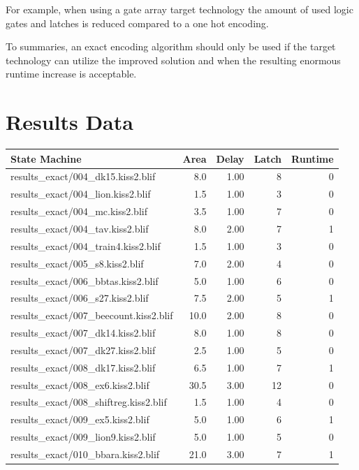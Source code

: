 For example, when using a gate array target technology the amount of used logic gates and latches is reduced compared to a one hot encoding.

To summaries, an exact encoding algorithm should only be used if the target technology can utilize the improved solution and when the resulting enormous runtime increase is acceptable. 

\chapter*{Results Data}

\begin{table}[h]
\centering
	\begin{tabular}{|l|r|r|r|r|}
	\hline
		\textbf{State Machine} & \textbf{Area} & \textbf{Delay} & \textbf{Latch} & \textbf{Runtime}\\
		\hline
		results\_exact/004\_dk15.kiss2.blif & 8.0 & 1.00 & 8 & 0\\
		results\_exact/004\_lion.kiss2.blif & 1.5 & 1.00 & 3 & 0\\
		results\_exact/004\_mc.kiss2.blif & 3.5 & 1.00 & 7 & 0\\
		results\_exact/004\_tav.kiss2.blif & 8.0 & 2.00 & 7 & 1\\
		results\_exact/004\_train4.kiss2.blif & 1.5 & 1.00 & 3 & 0\\
		results\_exact/005\_s8.kiss2.blif & 7.0 & 2.00 & 4 & 0\\
		results\_exact/006\_bbtas.kiss2.blif & 5.0 & 1.00 & 6 & 0\\
		results\_exact/006\_s27.kiss2.blif & 7.5 & 2.00 & 5 & 1\\
		results\_exact/007\_beecount.kiss2.blif & 10.0 & 2.00 & 8 & 0\\
		results\_exact/007\_dk14.kiss2.blif & 8.0 & 1.00 & 8 & 0\\
		results\_exact/007\_dk27.kiss2.blif & 2.5 & 1.00 & 5 & 0\\
		results\_exact/008\_dk17.kiss2.blif & 6.5 & 1.00 & 7 & 1\\
		results\_exact/008\_ex6.kiss2.blif & 30.5 & 3.00 & 12 & 0\\
		results\_exact/008\_shiftreg.kiss2.blif & 1.5 & 1.00 & 4 & 0\\
		results\_exact/009\_ex5.kiss2.blif & 5.0 & 1.00 & 6 & 1\\
		results\_exact/009\_lion9.kiss2.blif & 5.0 & 1.00 & 5 & 0\\
		results\_exact/010\_bbara.kiss2.blif & 21.0 & 3.00 & 7 & 1\\

\end{tabular}
\end{table}
